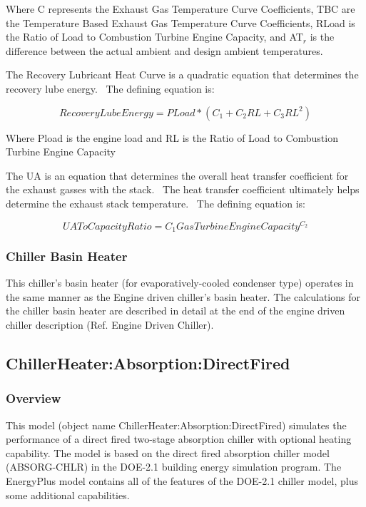 Where C represents the Exhaust Gas Temperature Curve Coefficients, TBC are the Temperature Based Exhaust Gas Temperature Curve Coefficients, RLoad is the Ratio of Load to Combustion Turbine Engine Capacity, and AT\(_{r}\) is the difference between the actual ambient and design ambient temperatures.

The Recovery Lubricant Heat Curve is a quadratic equation that determines the recovery lube energy.~ The defining equation is:

\begin{equation}
RecoveryLubeEnergy = PLoad * ({C_1} + {C_2}RL + {C_3}R{L^2})
\end{equation}

Where Pload is the engine load and RL is the Ratio of Load to Combustion Turbine Engine Capacity

The UA is an equation that determines the overall heat transfer coefficient for the exhaust gasses with the stack.~ The heat transfer coefficient ultimately helps determine the exhaust stack temperature.~ The defining equation is:

\begin{equation}
UAToCapacityRatio = {C_1}GasTurbineEngineCapacit{y^{{C_2}}}
\end{equation}

\subsubsection{Chiller Basin Heater}\label{chiller-basin-heater}

This chiller's basin heater (for evaporatively-cooled condenser type) operates in the same manner as the Engine driven chiller's basin heater. The calculations for the chiller basin heater are described in detail at the end of the engine driven chiller description (Ref. Engine Driven Chiller).

\subsection{ChillerHeater:Absorption:DirectFired}\label{chillerheaterabsorptiondirectfired}

\subsubsection{Overview}\label{overview-009}

This model (object name ChillerHeater:Absorption:DirectFired) simulates the performance of a direct fired two-stage absorption chiller with optional heating capability. The model is based on the direct fired absorption chiller model (ABSORG-CHLR) in the DOE-2.1 building energy simulation program. The EnergyPlus model contains all of the features of the DOE-2.1 chiller model, plus some additional capabilities.


